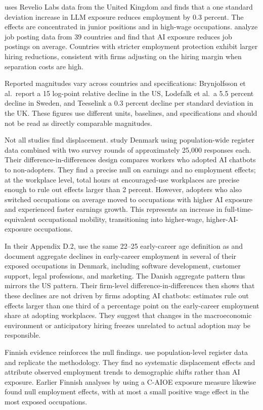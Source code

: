 \documentclass[12pt]{article}
\begin{document}
\cite{teeselink2025} uses Revelio Labs data from the United Kingdom and finds that a one standard deviation increase in LLM exposure reduces employment by 0.3 percent. The effects are concentrated in junior positions and in high-wage occupations. \cite{teeselink2026} analyze job posting data from 39 countries and find that AI exposure reduces job postings on average. Countries with stricter employment protection exhibit larger hiring reductions, consistent with firms adjusting on the hiring margin when separation costs are high.

Reported magnitudes vary across countries and specifications: Brynjolfsson et al.\ report a 15 log-point relative decline in the US, Lodefalk et al.\ a 5.5 percent decline in Sweden, and Teeselink a 0.3 percent decline per standard deviation in the UK. These figures use different units, baselines, and specifications and should not be read as directly comparable magnitudes.


Not all studies find displacement. \cite{humlum2026} study Denmark using population-wide register data combined with two survey rounds of approximately 25,000 responses each. Their difference-in-differences design compares workers who adopted AI chatbots to non-adopters. They find a precise null on earnings and no employment effects; at the workplace level, total hours at encouraged-use workplaces are precise enough to rule out effects larger than 2 percent. However, adopters who also switched occupations on average moved to occupations with higher AI exposure and experienced faster earnings growth. This represents an increase in full-time-equivalent occupational mobility, transitioning into higher-wage, higher-AI-exposure occupations.

In their Appendix D.2, \citet{humlum2026} use the same 22--25 early-career age definition as \citet{brynjolfsson2025} and document aggregate declines in early-career employment in several of their exposed occupations in Denmark, including software development, customer support, legal professions, and marketing. The Danish aggregate pattern thus mirrors the US pattern. Their firm-level difference-in-differences then shows that these declines are not driven by firms adopting AI chatbots: estimates rule out effects larger than one third of a percentage point on the early-career employment share at adopting workplaces. They suggest that changes in the macroeconomic environment or anticipatory hiring freezes unrelated to actual adoption may be responsible.

Finnish evidence reinforces the null findings. \cite{kauhanen2026} use population-level register data and replicate the \cite{brynjolfsson2025} methodology. They find no systematic displacement effects and attribute observed employment trends to demographic shifts rather than AI exposure. Earlier Finnish analyses by \cite{kauhanen2024, kauhanen2025} using a C-AIOE exposure measure likewise found null employment effects, with at most a small positive wage effect in the most exposed occupations.
\end{document}
